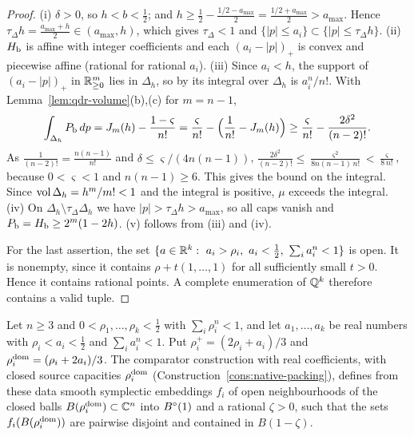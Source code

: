 \begin{proof}
(i) $\delta>0$, so $h<b<\frac12$; and $h\ge\frac12-\frac{1/2-a_{\max}}2=\frac{1/2+a_{\max}}2>a_{\max}$. Hence
$\tau_\Delta h=\frac{a_{\max}+h}2\in(a_{\max},h)$, which gives $\tau_\Delta<1$ and $\{|p|\le a_i\}\subset\{|p|\le\tau_\Delta h\}$.
(ii) $H_{\mathrm b}$ is affine with integer coefficients and each $(a_i-|p|)_+$ is convex and piecewise affine (rational for rational $a_i$).
(iii) Since $a_i<h$, the support of $(a_i-|p|)_+$ in $\mathbb{R}^m_{\ge0}$ lies in $\Delta_h$, so by 
its integral over $\Delta_h$ is $a_i^n/n!$. With Lemma~\ref{lem:qdr-volume}(b),(c) for $m=n-1$,
\[
 \int_{\Delta_h}P_{\mathrm b}\,dp=J_m(h)-\frac{1-\varsigma}{n!}=\frac{\varsigma}{n!}-\Bigl(\frac1{n!}-J_m(h)\Bigr)
 \ge\frac\varsigma{n!}-\frac{2\delta^2}{(n-2)!}.
\]
As $\frac1{(n-2)!}=\frac{n(n-1)}{n!}$ and $\delta\le\varsigma/(4n(n-1))$,
$\frac{2\delta^2}{(n-2)!}\le\frac{\varsigma^2}{8n(n-1)\,n!}<\frac{\varsigma}{8\,n!}$, because $0<\varsigma<1$ and $n(n-1)\ge6$.
This gives the bound on the integral. Since $\operatorname{vol}\Delta_h=h^m/m!<1$ and the integral is positive, $\mu$ exceeds the
integral. (iv) On $\Delta_h\setminus\tau_\Delta\Delta_h$ we have $|p|>\tau_\Delta h>a_{\max}$, so all caps vanish and
$P_{\mathrm b}=H_{\mathrm b}\ge2^m(1-2h)$. (v) follows from (iii) and (iv).

For the last assertion, the set $\{a\in\R^k:\ a_i>\rho_i,\ a_i<\frac12,\ \sum_ia_i^n<1\}$ is open. It is nonempty, since it
contains $\rho+t(1,\dots,1)$ for all sufficiently small $t>0$. Hence it contains rational points. A complete enumeration of $\mathbb{Q}^k$ therefore contains a valid tuple.
\end{proof}

\begin{theorem}\label{thm:qdr-packing}
Let $n\ge3$ and $0<\rho_1,\dots,\rho_k<\frac12$ with $\sum_i\rho_i^n<1$, and let $a_1,\dots,a_k$ be real numbers with
$\rho_i<a_i<\frac12$ and $\sum_ia_i^n<1$. Put $\rho_i^+=(2\rho_i+a_i)/3$ and $\rho_i^{\rm dom}=(\rho_i+2a_i)/3$. The
comparator construction with real coefficients, with closed source capacities $\rho_i^{\rm dom}$
(Construction~\ref{cons:native-packing}), defines from these data smooth symplectic embeddings $f_i$ of open
neighbourhoods of the closed balls $B(\rho_i^{\rm dom})\subset\mathbb{C}^n$ into $B^{\circ}(1)$ and a rational $\zeta>0$, such that the
sets $f_i(B(\rho_i^{\rm dom}))$ are pairwise disjoint and contained in $B(1-\zeta)$.
\end{theorem}

